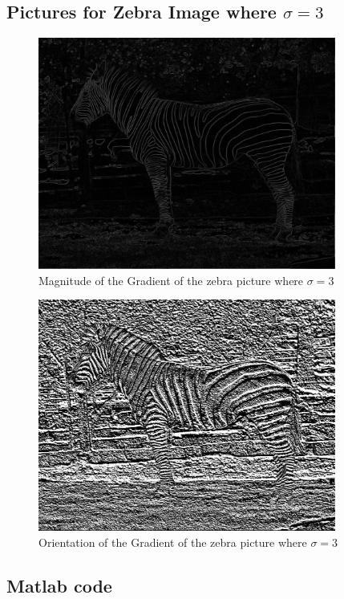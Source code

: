 \documentclass[11pt,psfig]{article}
\begin{document}
\subsection*{Pictures for Zebra Image where $\sigma=3$}

\begin{figure}[H]
\centering
\includegraphics[height=3in]{magGradient_zebra1.jpg}
\caption{Magnitude of the Gradient of the zebra picture where $\sigma=3$}
\end{figure}

\begin{figure}[H]
\centering
\includegraphics[height=3in]{orientGradient_zebra1.jpg}
\caption{Orientation of the Gradient of the zebra picture where $\sigma=3$}
\end{figure}

\newpage

\subsection*{Matlab code}
\end{document}
